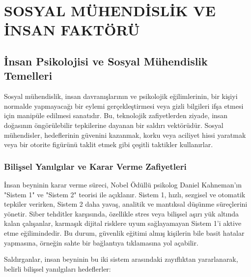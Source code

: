 \chapter{SOSYAL MÜHENDİSLİK VE İNSAN FAKTÖRÜ}


\section{İnsan Psikolojisi ve Sosyal Mühendislik Temelleri}

Sosyal mühendislik, insan davranışlarının ve psikolojik eğilimlerinin, bir kişiyi normalde yapmayacağı bir eylemi gerçekleştirmesi veya gizli bilgileri ifşa etmesi için manipüle edilmesi sanatıdır. Bu, teknolojik zafiyetlerden ziyade, insan doğasının öngörülebilir tepkilerine dayanan bir saldırı vektörüdür. Sosyal mühendisler, hedeflerinin güvenini kazanmak, korku veya aciliyet hissi yaratmak veya bir otorite figürünü taklit etmek gibi çeşitli taktikler kullanırlar.

\subsection{Bilişsel Yanılgılar ve Karar Verme Zafiyetleri}

İnsan beyninin karar verme süreci, Nobel Ödüllü psikolog Daniel Kahneman'ın "Sistem 1" ve "Sistem 2" teorisi ile açıklanır. Sistem 1, hızlı, sezgisel ve otomatik tepkiler verirken, Sistem 2 daha yavaş, analitik ve mantıksal düşünme süreçlerini yönetir. Siber tehditler karşısında, özellikle stres veya bilişsel aşırı yük altında kalan çalışanlar, karmaşık dijital risklere uyum sağlayamayan Sistem 1'i aktive etme eğilimindedir. Bu durum, güvenlik eğitimi almış kişilerin bile basit hatalar yapmasına, örneğin sahte bir bağlantıya tıklamasına yol açabilir.

Saldırganlar, insan beyninin bu iki sistem arasındaki zayıflıktan yararlanarak, belirli bilişsel yanılgıları hedeflerler:

